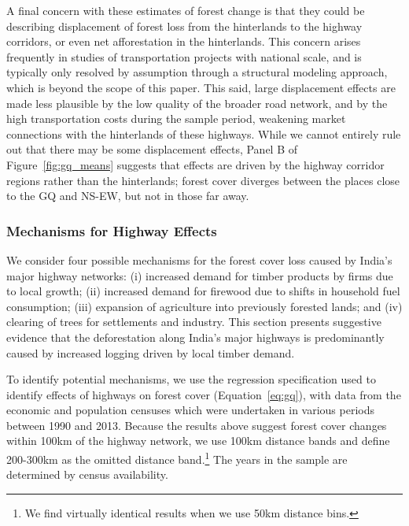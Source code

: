 A final concern with these estimates of forest change is that they
could be describing displacement of forest loss from the hinterlands
to the highway corridors, or even net afforestation in the
hinterlands. This concern arises frequently in studies of
transportation projects with national scale, and is typically only
resolved by assumption through a structural modeling approach, which
is beyond the scope of this paper.  This said, large displacement
effects are made less plausible by the low quality of the broader road
network, and by the high transportation costs during the sample
period, weakening market connections with the hinterlands of these
highways.  While we cannot entirely rule out that there may be some
displacement effects, Panel B of Figure~\ref{fig:gq_means} suggests
that effects are driven by the highway corridor regions rather than
the hinterlands; forest cover diverges between the places close to the
GQ and NS-EW, but not in those far away.

\subsubsection{Mechanisms for Highway Effects}

We consider four possible mechanisms for the forest cover loss caused
by India's major highway networks: (i) increased demand for timber
products by firms due to local growth; (ii) increased demand for
firewood due to shifts in household fuel consumption; (iii) expansion
of agriculture into previously forested lands; and (iv) clearing of
trees for settlements and industry. This section presents
suggestive evidence that the deforestation along India's major
highways is predominantly caused by increased logging driven by local
timber demand.

To identify potential mechanisms, we use the regression specification
used to identify effects of highways on forest cover
(Equation~\ref{eq:gq}), with data from the economic and population
censuses which were undertaken in various periods between 1990 and
2013. Because the results above suggest forest cover changes within
100km of the highway network, we use 100km distance bands and define
200-300km as the omitted distance band.\footnote{We find virtually
  identical results when we use 50km distance bins.} The years in the
sample are determined by census availability.

